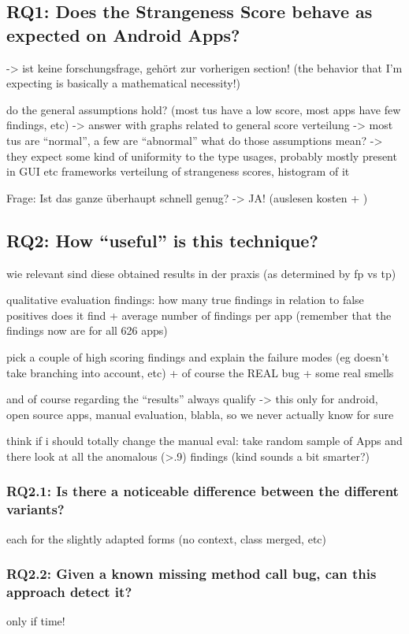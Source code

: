 \subsection{RQ1: Does the Strangeness Score behave as expected on Android Apps?}
-> ist keine forschungsfrage, gehört zur vorherigen section!
(the behavior that I'm expecting is basically a mathematical necessity!)

do the general assumptions hold? (most tus have a low score, most apps have few findings, etc)
    -> answer with graphs related to general score verteilung
    -> most tus are ``normal'', a few are ``abnormal''
    what do those assumptions mean? -> they expect some kind of uniformity to the type usages, probably mostly present in GUI etc frameworks
verteilung of strangeness scores, histogram of it

Frage: Ist das ganze überhaupt schnell genug?
-> JA!
(auslesen kosten + )

\subsection{RQ2: How ``useful'' is this technique?}
wie relevant sind diese obtained results in der praxis (as determined by fp vs tp)

qualitative evaluation findings:
how many true findings in relation to false positives does it find + average number of findings per app (remember that the findings now are for all 626 apps)

pick a couple of high scoring findings and explain the failure modes (eg doesn't take branching into account, etc)
+ of course the REAL bug + some real smells

and of course regarding the ``results'' always qualify -> this only for android, open source apps, manual evaluation, blabla, so we never actually know for sure

think if i should totally change the manual eval: take random sample of Apps and there look at all the anomalous (>.9) findings (kind sounds a bit smarter?)

\subsubsection{RQ2.1: Is there a noticeable difference between the different variants?}
each for the slightly adapted forms (no context, class merged, etc)

\subsubsection{RQ2.2: Given a known missing method call bug, can this approach detect it?}
only if time!

